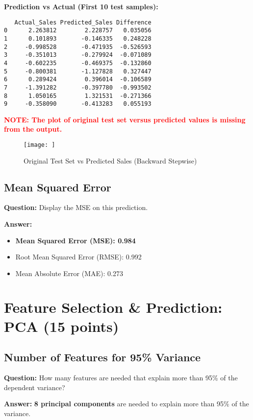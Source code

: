 \documentclass[11pt]{article}
\begin{document}
\textbf{Prediction vs Actual (First 10 test samples):}
\begin{verbatim}
   Actual_Sales Predicted_Sales Difference
0      2.263812        2.228757   0.035056
1      0.101893       -0.146335   0.248228
2     -0.998528       -0.471935  -0.526593
3     -0.351013       -0.279924  -0.071089
4     -0.602235       -0.469375  -0.132860
5     -0.800381       -1.127828   0.327447
6      0.289424        0.396014  -0.106589
7     -1.391282       -0.397780  -0.993502
8      1.050165        1.321531  -0.271366
9     -0.358090       -0.413283   0.055193
\end{verbatim}

\textcolor{red}{\textbf{NOTE: The plot of original test set versus predicted values is missing from the output.}}

\begin{figure}[H]
    \centering
    \texttt{[image: ]}
    \caption{Original Test Set vs Predicted Sales (Backward Stepwise)}
    \label{fig:stepwise_prediction}
\end{figure}

\subsection{Mean Squared Error}

\textbf{Question:} Display the MSE on this prediction.

\textbf{Answer:}
\begin{itemize}
    \item \textbf{Mean Squared Error (MSE): 0.984}
    \item Root Mean Squared Error (RMSE): 0.992
    \item Mean Absolute Error (MAE): 0.273
\end{itemize}

\section{Feature Selection \& Prediction: PCA (15 points)}

\subsection{Number of Features for 95\% Variance}

\textbf{Question:} How many features are needed that explain more than 95\% of the dependent variance?

\textbf{Answer:} \textbf{8 principal components} are needed to explain more than 95\% of the variance.
\end{document}
